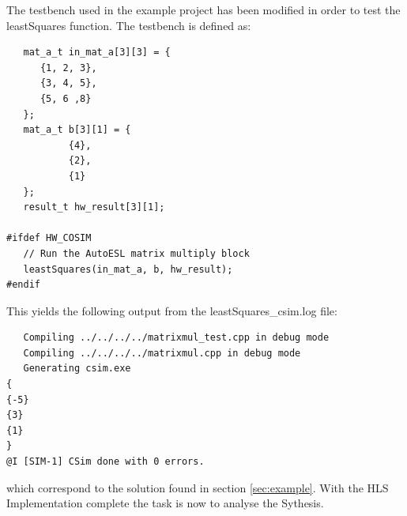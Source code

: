 The testbench used in the example project has been modified in order to test the leastSquares function. The testbench is defined as:
\begin{lstlisting}
   mat_a_t in_mat_a[3][3] = {
      {1, 2, 3},
      {3, 4, 5},
      {5, 6 ,8}
   };
   mat_a_t b[3][1] = {
		   {4},
		   {2},
		   {1}
   };
   result_t hw_result[3][1];

#ifdef HW_COSIM
   // Run the AutoESL matrix multiply block
   leastSquares(in_mat_a, b, hw_result);
#endif
\end{lstlisting}
This yields the following output from the leastSquares\_csim.log file:
\begin{verbatim}
   Compiling ../../../../matrixmul_test.cpp in debug mode
   Compiling ../../../../matrixmul.cpp in debug mode
   Generating csim.exe
{
{-5}
{3}
{1}
}
@I [SIM-1] CSim done with 0 errors.
\end{verbatim}
which correspond to the solution found in section \ref{sec:example}. With the HLS Implementation complete the task is now to analyse the Sythesis.
